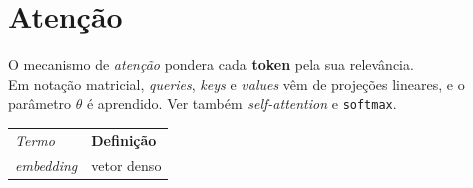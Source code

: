 \chapter{Atenção}\label{cap:atencao}
\renewcommand{\arraystretch}{1.2}

O mecanismo de \emph{atenção} pondera cada \textbf{token} pela sua relevância.\\
Em notação matricial, \emph{queries}, \emph{keys} e \emph{values} vêm de
projeções lineares, e o parâmetro $\theta$ é aprendido.\newline
\noindent Ver também \emph{self-attention} e \texttt{softmax}.

\begin{tabular}{ll}
\emph{Termo} & \textbf{Definição} \\
\emph{embedding} & vetor denso \\
\end{tabular}

